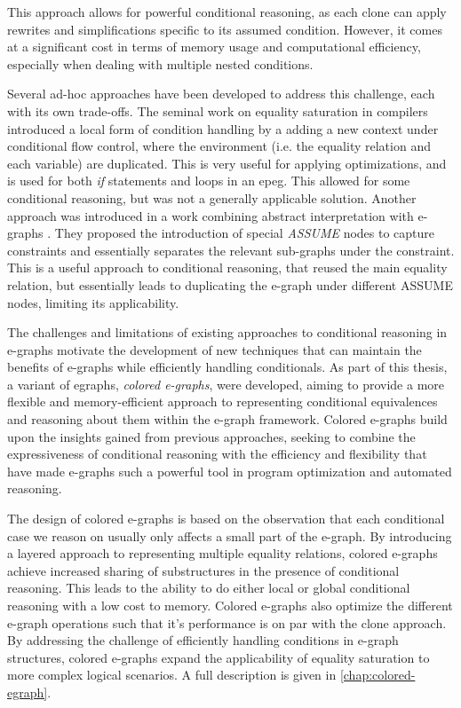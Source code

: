 This approach allows for powerful conditional reasoning, as each clone can apply rewrites and simplifications specific to its assumed condition. 
However, it comes at a significant cost in terms of memory usage and computational efficiency, especially when dealing with multiple nested conditions.

Several ad-hoc approaches have been developed to address this challenge, each with its own trade-offs.
The seminal work on equality saturation in compilers~\cite{eqsat} introduced a local form of condition handling by a adding a new context under conditional flow control, where the environment (i.e. the equality relation and each variable) are duplicated.
This is very useful for applying optimizations, and is used for both \textit{if} statements and loops in an \gls{epeg}.
This allowed for some conditional reasoning, but was not a generally applicable solution.
Another approach was introduced in a work combining abstract interpretation with e-graphs \cite{abstracteqsat}.
They proposed the introduction of special \emph{ASSUME} nodes to capture constraints and essentially separates the relevant sub-graphs under the constraint.
This is a useful approach to conditional reasoning, that reused the main equality relation, but essentially leads to duplicating the e-graph under different ASSUME nodes, limiting its applicability.

The challenges and limitations of existing approaches to conditional reasoning in e-graphs motivate the development of new techniques that can maintain the benefits of e-graphs while efficiently handling conditionals. 
As part of this thesis, a variant of \gls{egraphs}, \emph{colored e-graphs}, were developed, aiming to provide a more flexible and memory-efficient approach to representing conditional equivalences and reasoning about them within the e-graph framework.
Colored e-graphs build upon the insights gained from previous approaches, seeking to combine the expressiveness of conditional reasoning with the efficiency and flexibility that have made e-graphs such a powerful tool in program optimization and automated reasoning. 

The design of colored e-graphs is based on the observation that each conditional case we reason on usually only affects a small part of the e-graph.
By introducing a layered approach to representing multiple equality relations, colored e-graphs achieve increased sharing of substructures in the presence of conditional reasoning.
This leads to the ability to do either local or global conditional reasoning with a low cost to memory.
Colored e-graphs also optimize the different e-graph operations such that it's performance is on par with the clone approach.
By addressing the challenge of efficiently handling conditions in e-graph structures, colored e-graphs expand the applicability of equality saturation to more complex logical scenarios.
A full description is given in \autoref{chap:colored-egraph}.

